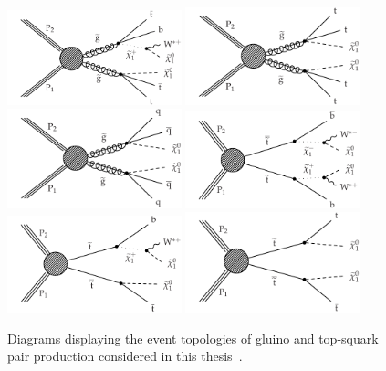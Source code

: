 \begin{figure}[thb!]
\includegraphics[width=0.45\textwidth]{figs/theory/T1tttb.pdf}
\includegraphics[width=0.45\textwidth]{figs/theory/T1tttt.pdf} \\
\includegraphics[width=0.45\textwidth]{figs/theory/T1qqqq.pdf} 
\includegraphics[width=0.45\textwidth]{figs/theory/T2bw.pdf} \\
\includegraphics[width=0.45\textwidth]{figs/theory/T2tb.pdf}
\includegraphics[width=0.45\textwidth]{figs/theory/T2tt.pdf}
\caption{Diagrams displaying the event topologies of gluino and top-squark pair production
  considered in this thesis~\cite{razor8TeV,jmgd}.\label{fig:SMSDiagrams}}
\end{figure}

